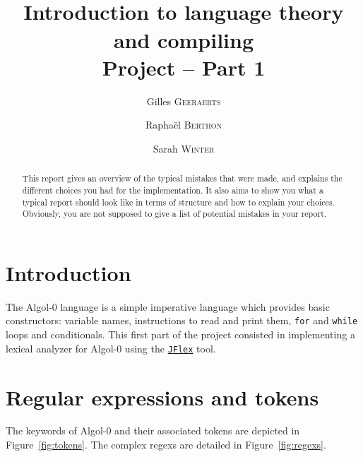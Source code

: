 \documentclass[a4paper]{article}
\title{\mylanguage\\Introduction to language theory and compiling\\
  Project -- Part 1}
\author{Gilles \textsc{Geeraerts}\and Rapha\"el \textsc{Berthon} \and
  Sarah \textsc{Winter}}
\newcommand{\mylanguage}{{\sc Algol-${0}$}\xspace}
\newcommand{\JFlex}{\texttt{JFlex}\xspace}
\begin{document}
\VerbatimFootnotes

\maketitle


\begin{abstract}
This report gives an overview of the typical mistakes that were made, and explains the different choices you had for the implementation. It also aims to show you what a typical report should look like in terms of structure and how to explain your choices. Obviously, you are not supposed to give a list of potential mistakes in your report.
\end{abstract}

\section{Introduction}

The \mylanguage language is a simple imperative language which provides basic constructors: variable names, instructions to read and print them, \texttt{for} and \texttt{while} loops and conditionals. This first part of the project consisted in implementing a lexical analyzer for \mylanguage using the \href{http://jflex.de/}{\JFlex} tool.

\section{Regular expressions and tokens}

The keywords of \mylanguage and their associated tokens are depicted in Figure~\ref{fig:tokens}. The complex regexs are detailed in Figure~\ref{fig:regexs}.
\end{document}
